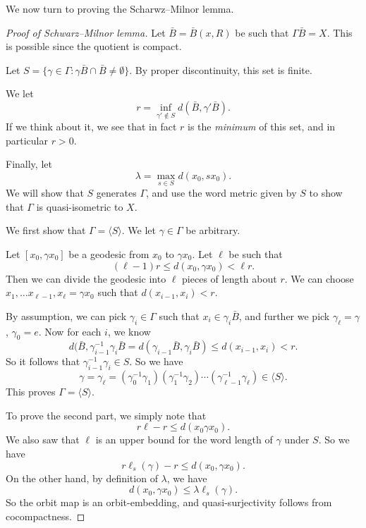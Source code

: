 \documentclass[a4paper]{article}
\begin{document}
We now turn to proving the Scharwz--Milnor lemma.
\begin{proof}[Proof of Schwarz--Milnor lemma]
  Let $\bar{B} = \bar{B}(x, R)$ be such that $\Gamma \bar{B} = X$. This is possible since the quotient is compact.

  Let $S = \{\gamma \in \Gamma: \gamma \bar{B} \cap \bar{B} \not=\emptyset\}$. By proper discontinuity, this set is finite.

  We let
  \[
    r = \inf_{\gamma' \not \in S} d(\bar{B}, \gamma' \bar{B}).
  \]
  If we think about it, we see that in fact $r$ is the \emph{minimum} of this set, and in particular $r > 0$.

  Finally, let
  \[
    \lambda = \max_{s \in S} d(x_0, s x_0).
  \]
  We will show that $S$ generates $\Gamma$, and use the word metric given by $S$ to show that $\Gamma$ is quasi-isometric to $X$.

  We first show that $\Gamma = \langle S\rangle$. We let $\gamma \in \Gamma$ be arbitrary.

  Let $[x_0, \gamma x_0]$ be a geodesic from $x_0$ to $\gamma x_0$. Let $\ell$ be such that
  \[
    (\ell - 1)r \leq d(x_0, \gamma x_0) < \ell r.
  \]
  Then we can divide the geodesic into $\ell$ pieces of length about $r$. We can choose $x_1, \ldots x_{\ell - 1}, x_\ell = \gamma x_0$ such that $d(x_{i - 1}, x_i) < r$.

  By assumption, we can pick $\gamma_i \in \Gamma$ such that $x_i \in \gamma_i \bar{B}$, and further we pick $\gamma_\ell = \gamma$, $\gamma_0 = e$. Now for each $i$, we know
  \[
    d(\bar{B}, \gamma_{i -1 }^{-1} \gamma_i \bar{B} = d(\gamma_{i - 1} \bar{B}, \gamma_i \bar{B}) \leq d(x_{i - 1}, x_i) < r.
  \]
  So it follows that $\gamma_{i - 1}^{-1} \gamma_i \in S$. So we have
  \[
    \gamma = \gamma_\ell = (\gamma_0^{-1} \gamma_1) (\gamma_1^{-1}\gamma_2) \cdots (\gamma_{\ell - 1}^{-1}\gamma_\ell) \in \langle S\rangle.
  \]
  This proves $\Gamma = \langle S \rangle$.

  To prove the second part, we simply note that
  \[
    r\ell - r \leq d (x_0 \gamma x_0).
  \]
  We also saw that $\ell$ is an upper bound for the word length of $\gamma$ under $S$. So we have
  \[
    r \ell_s(\gamma) - r \leq d(x_0, \gamma x_0).
  \]
  On the other hand, by definition of $\lambda$, we have
  \[
    d(x_0, \gamma x_0) \leq \lambda \ell_s(\gamma).
  \]
  So the orbit map is an orbit-embedding, and quasi-surjectivity follows from cocompactness. %
\end{proof}
\end{document}
